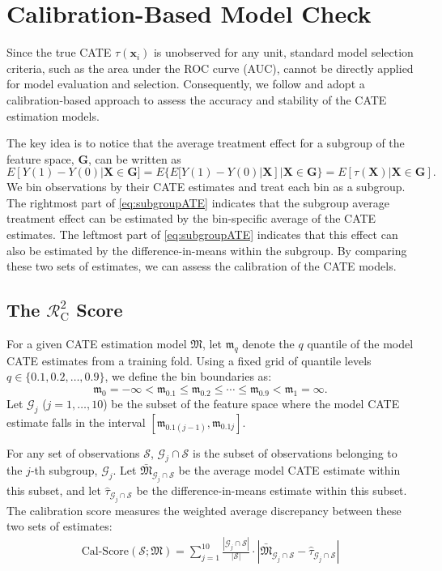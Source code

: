 \documentclass[12pt]{article}
\newcommand{\rsquare}{\ensuremath{\mathcal{R}^2_{\mathrm{C}}}}
\begin{document}
\section{Calibration-Based Model Check}
\label{sec:calibration}

Since the true CATE $\tau(\bm{x}_i)$ is unobserved for any unit, standard model selection criteria, such as the area under the ROC curve (AUC), cannot be directly applied for model evaluation and selection. Consequently, we follow \citet{dwivedi2020} and adopt a calibration-based approach to assess the accuracy and stability of the CATE estimation models.

The key idea is to notice that the average treatment effect for a subgroup of the feature space, $\bm{G}$, can be written as
\begin{equation}
E[Y(1)-Y(0)|\bm{X}\in\bm{G}]=E\{E[Y(1)-Y(0)|\bm{X}]|\bm{X}\in\bm{G}\}=E[\tau(\bm{X})|\bm{X}\in\bm{G}].\label{eq:subgroupATE}
\end{equation}
We bin observations by their CATE estimates and treat each bin as a subgroup. The rightmost part of \eqref{eq:subgroupATE} indicates that the subgroup average treatment effect can be estimated by the bin-specific average of the CATE estimates. The leftmost part of \eqref{eq:subgroupATE} indicates that this effect can also be estimated by the difference-in-means within the subgroup. By comparing these two sets of estimates, we can assess the calibration of the CATE models.

\subsection{The $\rsquare$ Score}
For a given CATE estimation model $\mathfrak{M}$, let $\mathfrak{m}_q$ denote the $q$ quantile of the model CATE estimates from a training fold. Using a fixed grid of quantile levels $q \in \{0.1, 0.2, \dots, 0.9\}$, we define the bin boundaries as:
\begin{equation*}
\mathfrak{m}_0 = -\infty < \mathfrak{m}_{0.1} \leq \mathfrak{m}_{0.2} \leq \cdots \leq \mathfrak{m}_{0.9} < \mathfrak{m}_{1} = \infty.
\end{equation*}
Let $\mathcal{G}_j$ ($j=1,\dots,10$) be the subset of the feature space where the model CATE estimate falls in the interval $[\mathfrak{m}_{0.1(j-1)}, \mathfrak{m}_{0.1j}]$.

For any set of observations $\mathcal{S}$, $\mathcal{G}_j \cap \mathcal{S}$ is the subset of observations belonging to the $j$-th subgroup, $\mathcal{G}_j$. Let $\bar{\mathfrak{M}}_{\mathcal{G}_j \cap \mathcal{S}}$ be the average model CATE estimate within this subset, and let $\widehat{\tau}_{\mathcal{G}_j \cap \mathcal{S}}$ be the difference-in-means estimate within this subset. The calibration score measures the weighted average discrepancy between these two sets of estimates:
\begin{align}
	\text{Cal-Score}(\mathcal{S}; \mathfrak{M}) = \sum_{j=1}^{10} \frac{|\mathcal{G}_j \cap \mathcal{S}|}{|\mathcal{S}|} \cdot \left| \bar{\mathfrak{M}}_{\mathcal{G}_j \cap \mathcal{S}} - \widehat{\tau}_{\mathcal{G}_j \cap \mathcal{S}} \right|\label{eq:calscore}
\end{align}
\end{document}

